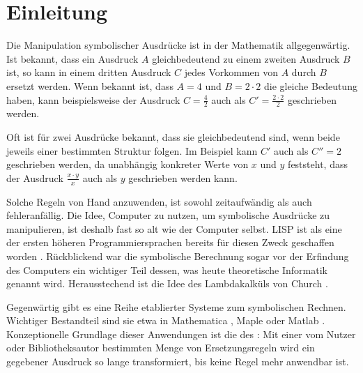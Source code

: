 

\chapter{Einleitung} \label{secEinleitung}

Die Manipulation symbolischer Ausdrücke ist in der Mathematik allgegenwärtig. Ist bekannt, dass ein Ausdruck $A$ gleichbedeutend zu einem zweiten Ausdruck $B$ ist, so kann in einem dritten Ausdruck $C$ jedes Vorkommen von $A$ durch $B$ ersetzt werden. 
Wenn bekannt ist, dass $A = 4$ und $B = 2 \cdot 2$ die gleiche Bedeutung haben, kann beispielsweise der Ausdruck $C = \frac{4}{2}$ auch als $C' = \frac{2 \cdot 2}{2}$ geschrieben werden.

Oft ist für zwei Ausdrücke bekannt, dass sie gleichbedeutend sind, wenn beide jeweils einer bestimmten Struktur folgen. Im Beispiel kann $C'$ auch als $C'' = 2$ geschrieben werden, da unabhängig konkreter Werte von $x$ und $y$ feststeht, dass der Ausdruck $\frac{x \cdot y}{x}$ auch als $y$ geschrieben werden kann.

Solche Regeln von Hand anzuwenden, ist sowohl zeitaufwändig als auch fehleranfällig. 
Die Idee, Computer zu nutzen, um symbolische Ausdrücke zu manipulieren, ist deshalb fast so alt wie der Computer selbst.  LISP ist als eine der ersten höheren Programmiersprachen bereits für diesen Zweck geschaffen worden \cite{lisp}. Rückblickend war die symbolische Berechnung sogar vor der Erfindung des Computers ein wichtiger Teil dessen, was heute theoretische Informatik genannt wird. Herausstechend ist die Idee des Lambdakalküls von Church \cite{ChurchLambda36}. 

Gegenwärtig gibt es eine Reihe etablierter Systeme zum symbolischen Rechnen. Wichtiger Bestandteil sind sie etwa in Mathematica \cite{MathematicaSymbolic}, Maple \cite{MapleSymbolic} oder Matlab \cite{MatlabSymbolic}.
Konzeptionelle Grundlage dieser Anwendungen ist die des : Mit einer vom Nutzer oder Bibliotheksautor bestimmten Menge von Ersetzungsregeln wird ein gegebener Ausdruck so lange transformiert, bis keine Regel mehr anwendbar ist.


